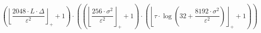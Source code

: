 \[\left(\left\lfloor \frac{2048 \cdot L \cdot \Delta}{\varepsilon^{2}} \right\rfloor_{+} + 1\right) \cdot \left(\left(\left\lfloor \frac{256 \cdot \sigma^{2}}{\varepsilon^{2}} \right\rfloor_{+} + 1\right) \cdot \left(\left\lfloor \tau \cdot \log\left(32 + \frac{8192 \cdot \sigma^{2}}{\varepsilon^{2}}\right) \right\rfloor_{+} + 1\right)\right)\]
